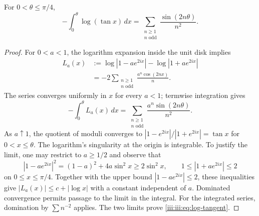 \begin{lemma}
\label{iii:iii:lem:log-tangent}
For $0<\theta\leq\pi/4$,
\begin{equation}
 -\int_0^\theta\log(\tan x)\,dx
 =\sum_{\substack{n\geq1\\n\text{ odd}}}
      \frac{\sin(2n\theta)}{n^2}.
 \label{iii:iii:eq:log-tangent}
\end{equation}
\end{lemma}
\begin{proof}
For $0<a<1$, the logarithm expansion inside the unit disk implies
\begin{align*}
 L_a(x)
 &:=\log|1-ae^{2ix}|-\log|1+ae^{2ix}|\\
 &=-2\sum_{\substack{n\geq1\\n\text{ odd}}}
       \frac{a^n\cos(2nx)}{n}.
\end{align*}
The series converges uniformly in $x$ for every $a<1$; termwise
integration gives
\[
 -\int_0^\theta L_a(x)\,dx
 =\sum_{\substack{n\geq1\\n\text{ odd}}}
       \frac{a^n\sin(2n\theta)}{n^2}.
\]
As $a\uparrow1$, the quotient of moduli converges to
$|1-e^{2ix}|/|1+e^{2ix}|=\tan x$ for $0<x\leq\theta$.
The logarithm's singularity at the origin is integrable. To justify
the limit, one may restrict to $a\geq1/2$ and observe that
\[
 |1-ae^{2ix}|^2=(1-a)^2+4a\sin^2x
 \geq2\sin^2x,
 \qquad 1\leq|1+ae^{2ix}|\leq2
\]
on $0\leq x\leq\pi/4$. Together with the upper bound
$|1-ae^{2ix}|\leq2$, these inequalities give
$|L_a(x)|\leq c+|\log x|$ with a constant independent of $a$.
Dominated convergence permits passage to the limit in the integral.
For the integrated series, domination by $\sum n^{-2}$ applies.
The two limits prove \eqref{iii:iii:eq:log-tangent}.
\end{proof}


